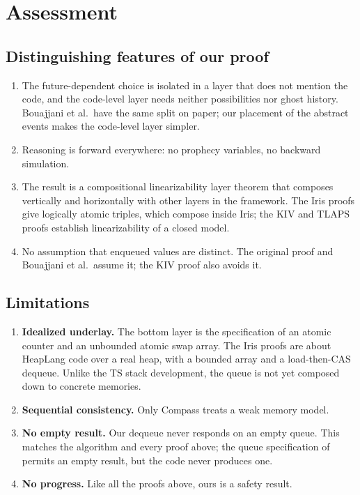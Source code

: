 \documentclass[11pt]{article}
\begin{document}
\section{Assessment}

\subsection{Distinguishing features of our proof}

\begin{enumerate}[nosep]
\item The future-dependent choice is isolated in a layer that does not
  mention the code, and the code-level layer needs neither possibilities
  nor ghost history.  Bouajjani et al.\ have the same split on paper; our
  placement of the abstract events makes the code-level layer simpler.
\item Reasoning is forward everywhere: no prophecy variables, no backward
  simulation.
\item The result is a compositional linearizability layer theorem that
  composes vertically and horizontally with other layers in the framework.
  The Iris proofs give logically atomic triples, which compose inside Iris;
  the KIV and TLAPS proofs establish linearizability of a closed model.
\item No assumption that enqueued values are distinct.  The original proof
  and Bouajjani et al.\ assume it; the KIV proof also avoids it.
\end{enumerate}

\subsection{Limitations}

\begin{enumerate}[nosep]
\item \textbf{Idealized underlay.}  The bottom layer is the specification of
  an atomic counter and an unbounded atomic swap array.  The Iris proofs are
  about HeapLang code over a real heap, with a bounded array and a
  load-then-CAS dequeue.  Unlike the TS stack development, the queue is not
  yet composed down to concrete memories.
\item \textbf{Sequential consistency.}  Only Compass treats a weak memory
  model.
\item \textbf{No empty result.}  Our dequeue never responds on an empty
  queue.  This matches the algorithm and every proof above; the queue
  specification of~\cite{ZGT26} permits an empty result, but the code never
  produces one.
\item \textbf{No progress.}  Like all the proofs above, ours is a safety
  result.
\end{enumerate}
\end{document}
